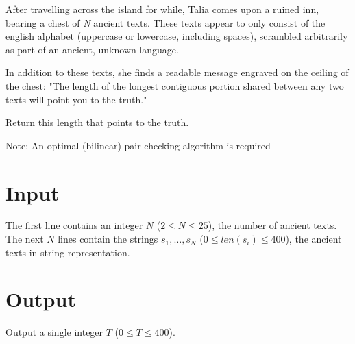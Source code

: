 
After travelling across the island for while, Talia comes upon a ruined inn, bearing a chest of \emph{N} ancient texts. 
These texts appear to only consist of the english alphabet (uppercase or lowercase, including spaces), scrambled arbitrarily as part of an ancient, unknown language. 

In addition to these texts, she finds a readable message engraved on the ceiling of the chest: "The length of the longest contiguous portion shared between any two texts will point you to the truth."

Return this length that points to the truth.

Note: An optimal (bilinear) pair checking algorithm is required


\section*{Input}
The first line contains an integer $N$ ($2 \le N \le 25$), the number of ancient texts. The next $N$ lines contain the strings $s_1, \dots, s_N$
($0 \le len(s_i) \le 400$), the ancient texts in string representation.

\section*{Output}
Output a single integer $T$ ($0 \le T \le 400$).
